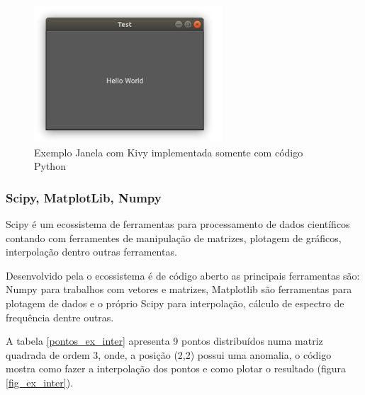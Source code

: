             \begin{figure}[h]
                \caption{Exemplo Janela com Kivy implementada somente com código Python}
                \begin{center}
                    \includegraphics[width=7cm]{texto/fig/hello_world_kivy.png} 
                \end{center}
                \label{janela_kivy} 
            \end{figure}


            
            \subsubsection{Scipy, MatplotLib, Numpy}
            \label{lim_scipy}
            
            Scipy é um ecossistema de ferramentas para processamento de dados científicos contando com ferramentes de manipulação de matrizes, plotagem de gráficos, interpolação dentro outras ferramentas.
            
            Desenvolvido pela  o ecossistema é de código aberto as principais ferramentas são: Numpy  para trabalhos com vetores e matrizes, Matplotlib  são ferramentas para plotagem de dados e o próprio Scipy para interpolação, cálculo de espectro de frequência dentre outras.
            
            A tabela \ref{pontos_ex_inter} apresenta 9 pontos distribuídos numa matriz quadrada de ordem 3, onde, a posição (2,2) possui uma anomalia, o código  mostra como fazer a interpolação dos pontos e como plotar o resultado (figura \ref{fig_ex_inter}).
            
